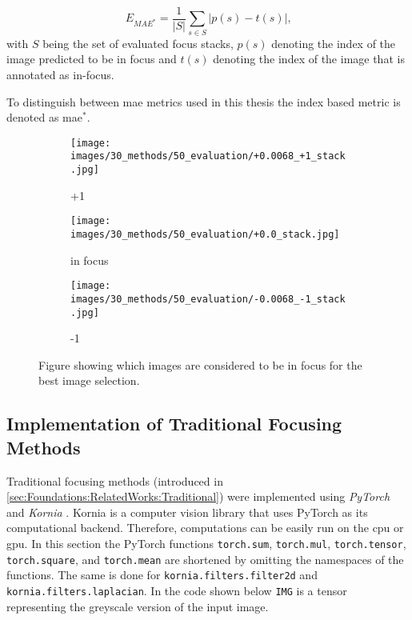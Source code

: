 $$E_{MAE^*} = \frac{1}{|S|}\sum_{s \in S} |p(s) - t(s)| \text{,}$$ with $S$ being the set of evaluated focus stacks, $p(s)$ denoting the index of the image predicted to be in focus and $t(s)$ denoting the index of the image that is annotated as in-focus.

To distinguish between \ac{mae} metrics used in this thesis the index based metric is denoted as \ac{mae}$^*$.

\begin{figure}[tb]
    \centering
    \begin{subfigure}[t]{0.3\textwidth}
        \centering
        \texttt{[image: images/30\_methods/50\_evaluation/+0.0068\_+1\_stack.jpg]}
        \caption{+1}
    \end{subfigure}
    \begin{subfigure}[t]{0.3\textwidth}
        \centering
        \texttt{[image: images/30\_methods/50\_evaluation/+0.0\_stack.jpg]}
        \caption{in focus}
    \end{subfigure}
    \begin{subfigure}[t]{0.3\textwidth}
        \centering
        \texttt{[image: images/30\_methods/50\_evaluation/-0.0068\_-1\_stack.jpg]}
        \caption{-1}
    \end{subfigure}

    \caption{Figure showing which images are considered to be in focus for the best image selection.}
    \label{fig:Methods:Data:InFocusExampleImages}
\end{figure}


\subsection{Implementation of Traditional Focusing Methods}
\label{sec:Methods:Evaluation:Traditional}

Traditional focusing methods (introduced in \autoref{sec:Foundations:RelatedWorks:Traditional}) were implemented using \emph{PyTorch} \cite{paszke2019pytorch} and \emph{Kornia} \cite{riba2020kornia}. Kornia is a computer vision library that uses PyTorch as its computational backend. Therefore, computations can be easily run on the \ac{cpu} or \ac{gpu}. In this section the PyTorch functions \texttt{torch.sum}, \texttt{torch.mul}, \texttt{torch.tensor}, \texttt{torch.square}, and \texttt{torch.mean} are shortened by omitting the namespaces of the functions. The same is done for \texttt{kornia.filters.filter2d} and \texttt{kornia.filters.laplacian}. In the code shown below \texttt{IMG} is a tensor representing the greyscale version of the input image.

